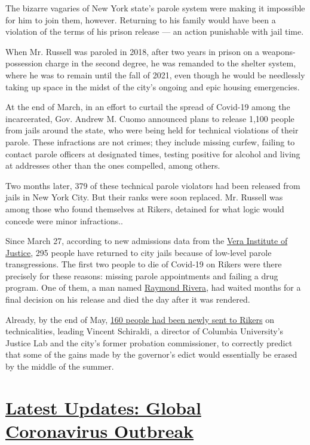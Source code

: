 The bizarre vagaries of New York state's parole system were making it
impossible for him to join them, however. Returning to his family would
have been a violation of the terms of his prison release --- an action
punishable with jail time.

When Mr. Russell was paroled in 2018, after two years in prison on a
weapons-possession charge in the second degree, he was remanded to the
shelter system, where he was to remain until the fall of 2021, even
though he would be needlessly taking up space in the midst of the city's
ongoing and epic housing emergencies.

At the end of March, in an effort to curtail the spread of Covid-19
among the incarcerated, Gov. Andrew M. Cuomo announced plans to release
1,100 people from jails around the state, who were being held for
technical violations of their parole. These infractions are not crimes;
they include missing curfew, failing to contact parole officers at
designated times, testing positive for alcohol and living at addresses
other than the ones compelled, among others.

Two months later, 379 of these technical parole violators had been
released from jails in New York City. But their ranks were soon
replaced. Mr. Russell was among those who found themselves at Rikers,
detained for what logic would concede were minor infractions..

Since March 27, according to new admissions data from the
\href{https://www.vera.org/}{Vera Institute of Justice}, 295 people have
returned to city jails because of low-level parole transgressions. The
first two people to die of Covid-19 on Rikers were there precisely for
these reasons: missing parole appointments and failing a drug program.
One of them, a man named
\href{https://www.nytimes.com/2020/04/09/nyregion/rikers-coronavirus-deaths-parolees.html}{Raymond
Rivera}, had waited months for a final decision on his release and died
the day after it was rendered.

Already, by the end of May,
\href{https://justicelab.columbia.edu/two-months-later}{160 people had
been newly sent to Rikers} on technicalities, leading Vincent Schiraldi,
a director of Columbia University's Justice Lab and the city's former
probation commissioner, to correctly predict that some of the gains made
by the governor's edict would essentially be erased by the middle of the
summer.

\hypertarget{latest-updates-global-coronavirus-outbreak}{%
\section{\texorpdfstring{\href{https://www.nytimes.com/2020/08/01/world/coronavirus-covid-19.html?action=click\&pgtype=Article\&state=default\&region=MAIN_CONTENT_1\&context=storylines_live_updates}{Latest
Updates: Global Coronavirus
Outbreak}}{Latest Updates: Global Coronavirus Outbreak}}\label{latest-updates-global-coronavirus-outbreak}}

